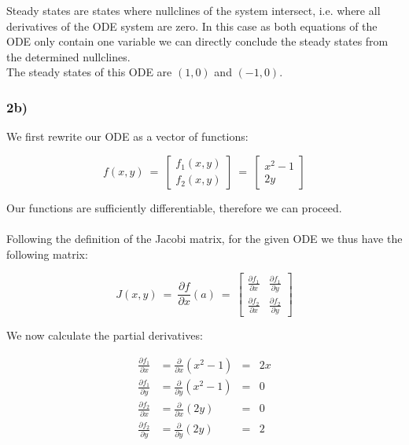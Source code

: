 \documentclass[]{scrartcl}
\begin{document}
Steady states are states where nullclines of the system intersect, i.e. where all derivatives of the ODE system are zero.
In this case as both equations of the ODE only contain one variable we can directly conclude the steady states from the determined nullclines.
\\
The steady states of this ODE are $(1,0)$ and $(-1,0)$.




\subsubsection*{2b)}

We first rewrite our ODE as a vector of functions:

\[
f(x,y) ~=~ \left[ \begin{array}{c} f_1(x,y) \\ f_2(x,y) \end{array} \right] ~=~ \left[ \begin{array}{c} x^2 - 1 \\ 2y \end{array} \right]
\]

Our functions are sufficiently differentiable, therefore we can proceed.
\\ \\
Following the definition of the Jacobi matrix, for the given ODE we thus have the following matrix:

\[
J(x,y) ~=~ \frac{\partial f}{\partial x}(a) ~=~
\begin{bmatrix}
  \frac{\partial f_1}{\partial x} & \frac{\partial f_1}{\partial y} \\[1ex] %
  \frac{\partial f_2}{\partial x} & \frac{\partial f_2}{\partial y}
\end{bmatrix}
\]

We now calculate the partial derivatives:

\begin{center}
\begin{align*}
	\frac{\partial f_1}{\partial x} &= \frac{\partial}{\partial x}(x^2 - 1) &= & 2x \\
	\frac{\partial f_1}{\partial y} &= \frac{\partial}{\partial y}(x^2 - 1) &= & 0 \\
	\frac{\partial f_2}{\partial x} &= \frac{\partial}{\partial x}(2y)	&= & 0 \\
	\frac{\partial f_2}{\partial y} &= \frac{\partial}{\partial y}(2y)	&= & 2 \\
\end{align*}
\end{center}
\end{document}
